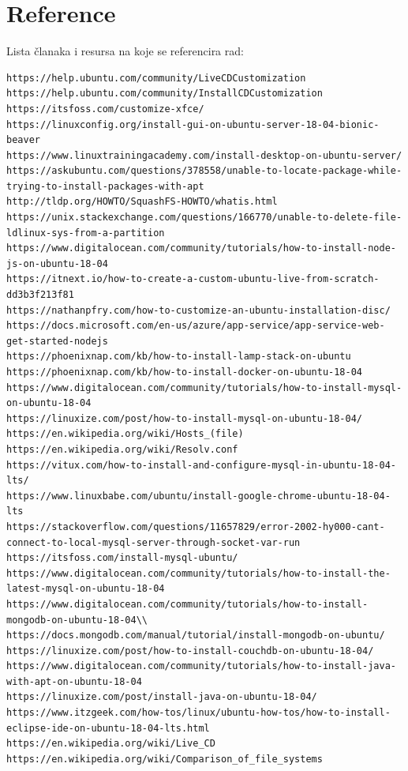 \documentclass[12pt,vi]{mitthesis}
\begin{document}
\chapter*{Reference}
\indent
Lista članaka i resursa na koje se referencira rad:
\begin{lstlisting}[style=BashInputStyle]
https://help.ubuntu.com/community/LiveCDCustomization
https://help.ubuntu.com/community/InstallCDCustomization
https://itsfoss.com/customize-xfce/
https://linuxconfig.org/install-gui-on-ubuntu-server-18-04-bionic-beaver
https://www.linuxtrainingacademy.com/install-desktop-on-ubuntu-server/
https://askubuntu.com/questions/378558/unable-to-locate-package-while-trying-to-install-packages-with-apt
http://tldp.org/HOWTO/SquashFS-HOWTO/whatis.html
https://unix.stackexchange.com/questions/166770/unable-to-delete-file-ldlinux-sys-from-a-partition
https://www.digitalocean.com/community/tutorials/how-to-install-node-js-on-ubuntu-18-04
https://itnext.io/how-to-create-a-custom-ubuntu-live-from-scratch-dd3b3f213f81
https://nathanpfry.com/how-to-customize-an-ubuntu-installation-disc/
https://docs.microsoft.com/en-us/azure/app-service/app-service-web-get-started-nodejs
https://phoenixnap.com/kb/how-to-install-lamp-stack-on-ubuntu
https://phoenixnap.com/kb/how-to-install-docker-on-ubuntu-18-04
https://www.digitalocean.com/community/tutorials/how-to-install-mysql-on-ubuntu-18-04
https://linuxize.com/post/how-to-install-mysql-on-ubuntu-18-04/
https://en.wikipedia.org/wiki/Hosts_(file)
https://en.wikipedia.org/wiki/Resolv.conf
https://vitux.com/how-to-install-and-configure-mysql-in-ubuntu-18-04-lts/
https://www.linuxbabe.com/ubuntu/install-google-chrome-ubuntu-18-04-lts
https://stackoverflow.com/questions/11657829/error-2002-hy000-cant-connect-to-local-mysql-server-through-socket-var-run
https://itsfoss.com/install-mysql-ubuntu/
https://www.digitalocean.com/community/tutorials/how-to-install-the-latest-mysql-on-ubuntu-18-04
https://www.digitalocean.com/community/tutorials/how-to-install-mongodb-on-ubuntu-18-04\\
https://docs.mongodb.com/manual/tutorial/install-mongodb-on-ubuntu/
https://linuxize.com/post/how-to-install-couchdb-on-ubuntu-18-04/
https://www.digitalocean.com/community/tutorials/how-to-install-java-with-apt-on-ubuntu-18-04
https://linuxize.com/post/install-java-on-ubuntu-18-04/
https://www.itzgeek.com/how-tos/linux/ubuntu-how-tos/how-to-install-eclipse-ide-on-ubuntu-18-04-lts.html
https://en.wikipedia.org/wiki/Live_CD
https://en.wikipedia.org/wiki/Comparison_of_file_systems

\end{lstlisting}
\end{document}
